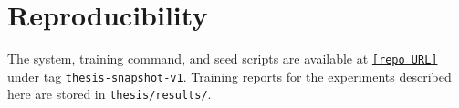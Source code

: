 \documentclass[conference]{IEEEtran}
\begin{document}
\section*{Reproducibility}

The system, training command, and seed scripts are available at
\href{https://github.com/[user]/[repo]}{\texttt{[repo URL]}} under tag
\texttt{thesis-snapshot-v1}. Training reports for the experiments described
here are stored in \texttt{thesis/results/}.



\end{document}
